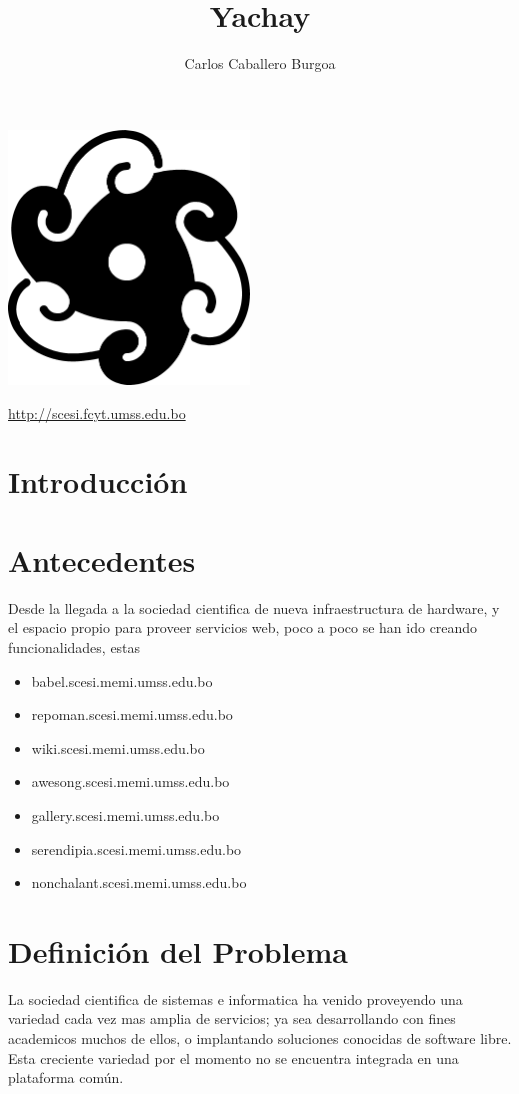 \documentclass[letter,12pt]{article}
\title{\bf Yachay}
\author{Carlos Caballero Burgoa}
\begin{document}
\maketitle
\begin{center}\includegraphics[width=0.48\textwidth]{yachay.png}\end{center}
\begin{center}\url {http://scesi.fcyt.umss.edu.bo}\end{center}
\pagebreak

\tableofcontents
\pagebreak

\section{Introducción}

\section{Antecedentes}
Desde la llegada a la sociedad cientifica de nueva infraestructura de hardware, y el espacio propio para proveer servicios web, poco a poco se han ido creando funcionalidades, estas

\begin{itemize}
\item babel.scesi.memi.umss.edu.bo
\item repoman.scesi.memi.umss.edu.bo
\item wiki.scesi.memi.umss.edu.bo
\item awesong.scesi.memi.umss.edu.bo
\item gallery.scesi.memi.umss.edu.bo
\item serendipia.scesi.memi.umss.edu.bo
\item nonchalant.scesi.memi.umss.edu.bo
\end{itemize}

\section{Definición del Problema}
La sociedad cientifica de sistemas e informatica ha venido proveyendo una variedad cada vez mas
amplia de servicios; ya sea desarrollando con fines academicos muchos de ellos, o implantando
soluciones conocidas de software libre. Esta creciente variedad por el momento no se encuentra
integrada en una plataforma común.
\end{document}
